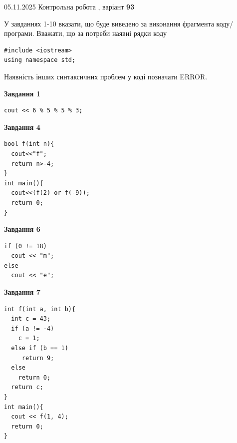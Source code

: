 \documentclass[12pt, ukrainian]{article}
\begin{document}
{\Large{05.11.2025 Контрольна робота , варіант  \No \textbf { 93 }\par}}
{
\begin {large}
У завданнях 1-10 вказати, що буде виведено за виконання фрагмента коду/про\-гра\-ми.
Вважати, що за потреби наявні рядки коду
\begin{verbatim}
#include <iostream>
using namespace std;
\end{verbatim}
Наявність інших синтаксичних проблем у коді позначати ERROR.

\begin{minipage}[t]{7.0cm}

\begin{center}
\textbf{Завдання 1}
\end{center}
\vspace{-8mm}

\begin{verbatim}
cout << 6 % 5 % 5 % 3;
\end{verbatim}



\begin{center}
\textbf{Завдання 4}
\end{center}
\vspace{-8mm}

\begin{verbatim}
bool f(int n){
  cout<<"f";
  return n>-4;
}
int main(){
  cout<<(f(2) or f(-9));
  return 0;
}
\end{verbatim}



\begin{center}
\textbf{Завдання 6}
\end{center}
\vspace{-8mm}

\begin{verbatim}
if (0 != 18)
  cout << "m";
else
  cout << "e";
\end{verbatim}



\begin{center}
\textbf{Завдання 7}
\end{center}
\vspace{-8mm}

\begin{verbatim}
int f(int a, int b){
  int c = 43;
  if (a != -4)
    c = 1;
  else if (b == 1)
     return 9;
  else
    return 0;
  return c;
}
int main(){
  cout << f(1, 4);
  return 0;
}
\end{verbatim}


\end{minipage}
\end{large}}
\end{document}
